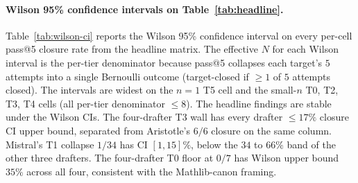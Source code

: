 \paragraph{Wilson 95\% confidence intervals on Table~\ref{tab:headline}.}
Table~\ref{tab:wilson-ci} reports the Wilson 95\% confidence interval
on every per-cell pass@5 closure rate from the headline matrix. The
effective $N$ for each Wilson interval is the per-tier denominator
because pass@5 collapses each target's $5$ attempts into a single
Bernoulli outcome (target-closed if $\geq 1$ of $5$ attempts closed).
The intervals are widest on the $n=1$ T5 cell and the small-$n$ T0,
T2, T3, T4 cells (all per-tier denominator $\leq 8$). The headline
findings are stable under the Wilson CIs. The four-drafter T3 wall
has every drafter $\leq 17\%$ closure CI upper bound, separated from
Aristotle's $6/6$ closure on the same column. Mistral's T1 collapse
$1/34$ has CI $[1, 15]\%$, below the $34$ to $66\%$ band of the
other three drafters. The four-drafter T0 floor at $0/7$ has Wilson
upper bound $35\%$ across all four, consistent with the Mathlib-canon
framing.


